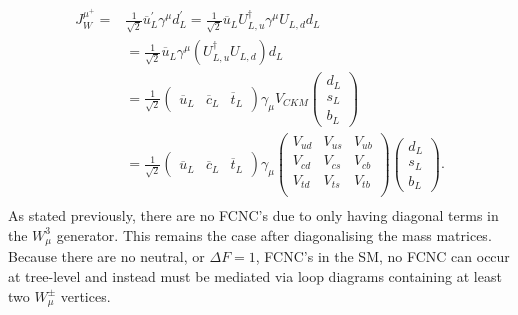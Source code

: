 \begin{equation}
\begin{split}
  J^{\mu^{+}}_{W} =
  & \frac{1}{\sqrt{2}}  \overline{u}^{\prime}_{L}\gamma^{\mu}d^{\prime}_{L} = \frac{1}{\sqrt{2}}\overline{u}_{L}U^{\dagger}_{L,u}\gamma^{\mu}U_{L,d}d_{L} \\
  & = \frac{1}{\sqrt{2}}\overline{u}_{L}\gamma^{\mu}(U^{\dagger}_{L,u}U_{L,d})d_{L} \\
  & = \frac{1}{\sqrt{2}}\begin{pmatrix}\overline{u}_{L}&\overline{c}_{L}&\overline{t}_{L}\end{pmatrix}\gamma_{\mu}V_{CKM}\begin{pmatrix}d_{L}\\s_{L}\\b_{L}\end{pmatrix} \\
  & = \frac{1}{\sqrt{2}}\begin{pmatrix}\overline{u}_{L}&\overline{c}_{L}&\overline{t}_{L}\end{pmatrix}\gamma_{\mu}\begin{pmatrix}V_{ud}&V_{us}&V_{ub}\\V_{cd}&V_{cs}&V_{cb}\\V_{td}&V_{ts}&V_{tb}\\\end{pmatrix} \begin{pmatrix}  d_{L}\\s_{L}\\b_{L}\end{pmatrix}. \\
\end{split}
\label{eq:ckm}
\end{equation}
As stated previously, there are no FCNC's due to only having diagonal terms in the $W^{3}_{\mu}$ generator. This remains the case after diagonalising the mass matrices. Because there are no neutral, or $\Delta F = 1$, FCNC's in the SM, no FCNC can occur at tree-level and instead must be mediated via loop diagrams containing at least two $W^{\pm}_{\mu}$ vertices. 



